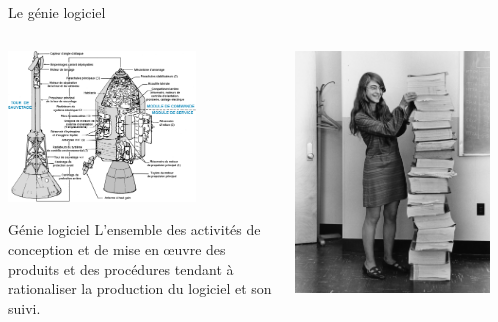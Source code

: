 \documentclass[xcolor={dvipsnames}]{beamer}
\begin{document}
\begin{frame}{Le génie logiciel}
  \begin{columns}
    \begin{column}{0.6\textwidth}
      \begin{center}
        \includegraphics[height=4cm]{media/apollo.png}
      \end{center}
      \begin{block}{Génie logiciel}
        L'ensemble des activités de conception et de mise en œuvre des produits et des procédures tendant à rationaliser la production du logiciel et son suivi.
      \end{block}
    \end{column}
    \begin{column}{0.4\textwidth}
      \begin{center}
        \includegraphics[width=0.9\textwidth]{media/MHamilton.jpg}
      \end{center}
    \end{column}
  \end{columns}
\end{frame}
\end{document}
